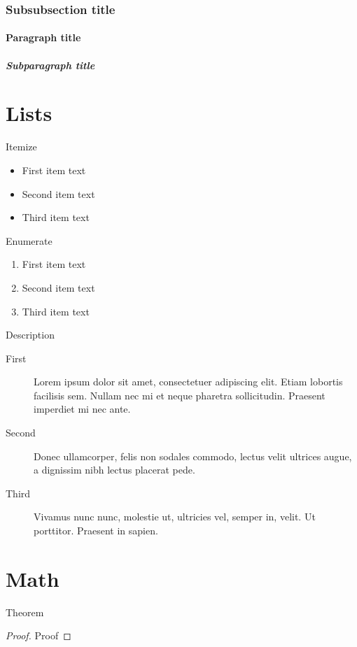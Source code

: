\documentclass[english,counters by chapter]{uniud}
\begin{document}
\subsubsection{Subsubsection title}

\blindtext

\paragraph{Paragraph title}

\blindtext

\subparagraph{Subparagraph title}

\blindtext

\section{Lists}


Itemize
\begin{itemize}
\item First item text
\item Second item text
\item Third item text
\end{itemize}
Enumerate
\begin{enumerate}
\item First item text
\item Second item text
\item Third item text
\end{enumerate}
Description
\begin{description}
\item[First] 
	Lorem ipsum dolor sit amet, consectetuer adipiscing elit. Etiam lobortis facilisis sem. Nullam nec mi et neque pharetra sollicitudin. Praesent imperdiet mi nec ante.
\item[Second] 
	 Donec ullamcorper, felis non sodales commodo, lectus velit ultrices augue, a dignissim nibh lectus placerat pede.
\item[Third] 
	Vivamus nunc nunc, molestie ut, ultricies vel, semper in, velit. Ut porttitor. Praesent in sapien.
\end{description}


\section{Math}

\begin{theorem}
	\label{thm:first}
	Theorem
\end{theorem}
\begin{proof}
	Proof
\end{proof}
\end{document}
